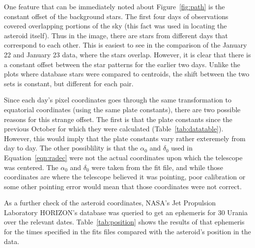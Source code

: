 \documentclass[a4paper,12pt]{article}
\begin{document}
One feature that can be immediately noted about Figure~\ref{fig:path} is the constant offset of the background stars. The first four days of observations covered overlapping portions of the sky (this fact was used in locating the asteroid itself). Thus in the image, there are stars from different days that correspond to each other. This is easiest to see in the comparison of the January 22 and January 23 data, where the stars overlap. However, it is clear that there is a constant offset between the star patterns for the earlier two days. Unlike the plots where database stars were compared to centroids, the shift between the two sets is constant, but different for each pair.

Since each day's pixel coordinates goes through the same transformation to equatorial coordinates (using the same plate constants), there are two possible reasons for this strange offset. The first is that the plate constants since the previous October for which they were calculated (Table~\ref{tab:datatable}). However, this would imply that the plate constants vary rather exteremely from day to day. The other possiblility is that the $\alpha_{0}$ and $\delta_{0}$ used in Equation~\ref{eqn:radec} were not the actual coordinates upon which the telescope was centered. The $\alpha_{0}$ and $\delta_{0}$ were taken from the fit file, and while those coordinates are where the telescope believed it was pointing, poor calibration or some other pointing error would mean that those coordinates were not correct.

As a further check of the asteroid coordinates, NASA's Jet Propulsion Laboratory HORIZON's database was queried to get an ephemeris for 30 Urania over the relevant dates. Table~\ref{tab:position} shows the results of that ephemeris for the times specified in the fits files compared with the asteroid's position in the data.
\end{document}
